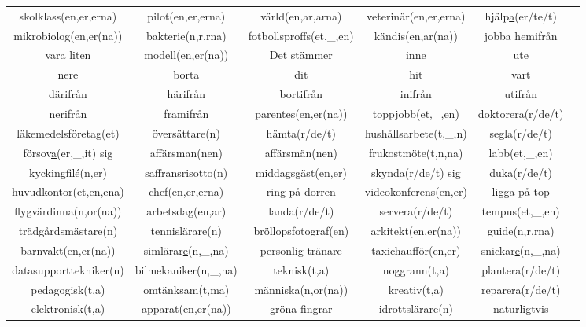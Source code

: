 
\begin{center}
    \begin{adjustwidth}{-2.4cm}{}
        \begin{tabular}{|c c c c c c|}
            \hline
            skolklass(en,er,erna) & pilot(en,er,erna) & värld(en,ar,arna) & veterinär(en,er,erna) & hjälp\underline{a}(er/te/t) &  \\
            mikrobiolog(en,er(na)) & bakterie(n,r,rna) & fotbollsproffs(et,\_,en) & kändis(en,ar(na)) & jobba hemifrån &  \\
            vara liten & modell(en,er(na)) & Det stämmer & inne & ute &  \\
            nere & borta & dit & hit & vart &  \\
            därifrån & härifrån & bortifrån & inifrån & utifrån &  \\
            nerifrån & framifrån & parentes(en,er(na)) & toppjobb(et,\_,en) & doktorera(r/de/t) &  \\
            läkemedelsföretag(et) & översättare(n) & hämta(r/de/t) & hushållsarbete(t,\_,n) & segla(r/de/t) &  \\
            försov\underline{a}(er,\_,it) sig & affärsman(nen) & affärsmän(nen) & frukostmöte(t,n,na) & labb(et,\_,en) &  \\
            kyckingfil\'e(n,er) & saffransrisotto(n) & middagsgäst(en,er) & skynda(r/de/t) sig & duka(r/de/t) &  \\
            huvudkontor(et,en,ena) & chef(en,er,erna) & ring på dorren & videokonferens(en,er) & ligga på top &  \\
            flygvärdinna(n,or(na)) & arbetsdag(en,ar) & landa(r/de/t) & servera(r/de/t) & tempus(et,\_,en) &  \\
            trädgårdsmästare(n) & tennislärare(n) & bröllopsfotograf(en) & arkitekt(en,er(na)) & guide(n,r,rna) &  \\
            barnvakt(en,er(na)) & simlärar\underline{e}(n,\_,na) & personlig tränare & taxichaufför(en,er) & snickar\underline{e}(n,\_,na) &  \\
            datasupporttekniker(n) & bilmekaniker(n,\_,na) & teknisk(t,a) & noggrann(t,a) & plantera(r/de/t) &  \\
            pedagogisk(t,a) & omtänksam(t,ma) & människa(n,or(na)) & kreativ(t,a) & reparera(r/de/t) &  \\
            elektronisk(t,a) & apparat(en,er(na)) & gröna fingrar & idrottslärare(n) & naturligtvis &  \\

\end{tabular}
\end{adjustwidth}
\end{center}
